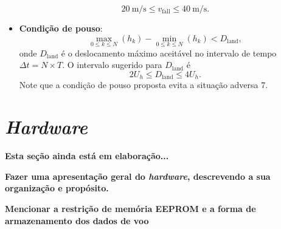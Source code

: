 \documentclass[12pt,a4paper]{article}
\begin{document}
\begin{itemize}
	\[20~\text{m/s} \le v_\text{fall}\le 40~\text{m/s}.\]
    \item \textbf{Condição de pouso}:
	\begin{equation}
	\max_{0\le k \le N}(h_k)-\min_{0\le k \le N}(h_k)<D_\text{land},
	\end{equation}
	onde $D_\text{land}$ é o deslocamento máximo aceitável no intervalo de tempo $\Delta t=N\times T$. O intervalo sugerido para $D_\text{land}$ é
	\begin{equation}
	2U_h\le D_\text{land} \le 4 U_h.
	\end{equation}
	Note que a condição de pouso proposta evita a situação adversa 7.
\end{itemize}

\section{\textit{Hardware}}
\textbf{Esta seção ainda está em elaboração...}

\textbf{Fazer uma apresentação geral do \textit{hardware}, descrevendo a sua organização e propósito.}

\textbf{Mencionar a restrição de memória EEPROM e a forma de armazenamento dos dados de voo}
\end{document}
